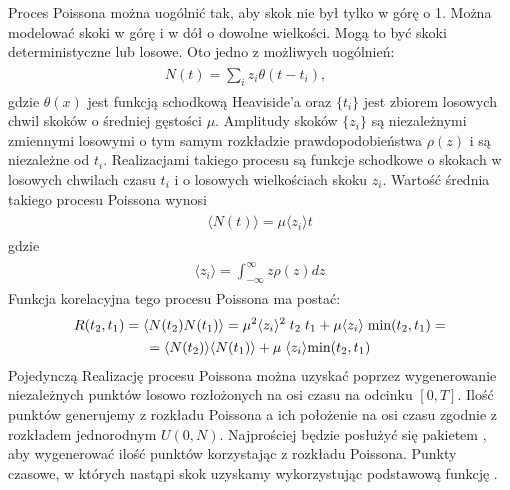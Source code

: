\documentclass[a4paper,12pt,polish]{sphinxmanual}
\begin{document}
Proces Poissona można uogólnić tak, aby skok nie był tylko w górę o 1. Można modelować skoki w górę i w dół o dowolne wielkości. Mogą to być skoki deterministyczne lub losowe. Oto jedno z możliwych uogólnień:
\label{ch3/chIII021:equation-eqn45}\begin{gather}
\begin{split}N(t) = \sum\limits_i z_i \theta (t-t_i), \qquad\end{split}\label{ch3/chIII021-eqn45}
\end{gather}
gdzie $\theta (x)$ jest funkcją schodkową Heaviside'a oraz $\{t_i\}$ jest zbiorem losowych chwil skoków o średniej gęstości $\mu$. Amplitudy skoków $\{z_i\}$ są niezależnymi zmiennymi losowymi o tym samym rozkładzie prawdopodobieństwa $\rho(z)$ i są niezależne od $t_i$. Realizacjami takiego procesu są funkcje schodkowe o skokach w losowych chwilach czasu $t_i$ i o losowych wielkościach skoku $z_i$. Wartość średnia takiego procesu Poissona wynosi
\label{ch3/chIII021:equation-eqn46}\begin{gather}
\begin{split}\langle N(t)\rangle = \mu\langle z_i\rangle t\end{split}\label{ch3/chIII021-eqn46}
\end{gather}
gdzie
\label{ch3/chIII021:equation-eqn47}\begin{gather}
\begin{split}\langle z_i \rangle = \int_{-\infty}^{\infty} z \rho(z) dz\end{split}\label{ch3/chIII021-eqn47}
\end{gather}
Funkcja korelacyjna tego procesu Poissona ma postać:
\label{ch3/chIII021:equation-eqn48}\begin{gather}
\begin{split}R(t_2, t_1) = \langle N(t_2) N(t_1)\rangle = \mu^2 \langle z_i\rangle^2 \;t_2 \;t_1 + \mu \langle z_i\rangle\; \mbox{min}(t_2, t_1) =\end{split}\label{ch3/chIII021-eqn48}\\\begin{split}= \langle N(t_2)\rangle\langle N(t_1)\rangle+ \mu \;\langle z_i\rangle \mbox{min}(t_2, t_1)\end{split}\notag
\end{gather}
Pojedynczą Realizację procesu Poissona można uzyskać poprzez wygenerowanie  niezależnych
punktów losowo rozłożonych na osi czasu na odcinku $[0,T]$. Ilość punktów generujemy z
rozkładu Poissona a ich położenie na osi czasu zgodnie z rozkładem jednorodnym $U(0,N)$.
Najprościej będzie posłużyć się pakietem , aby wygenerować
ilość punktów korzystając z rozkładu Poissona. Punkty czasowe, w których nastąpi skok
uzyskamy wykorzystując podstawową funkcję .
\end{document}
